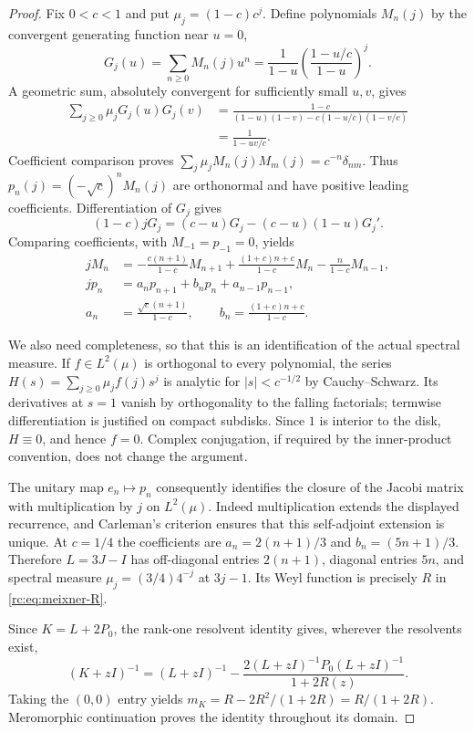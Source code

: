 \documentclass[11pt,a4paper]{article}
\theoremstyle{definition}
\theoremstyle{remark}
\theoremstyle{plain}
\numberwithin{equation}{section}
\begin{document}
\begin{proof}
Fix $0<c<1$ and put $\mu_j=(1-c)c^j$.  Define polynomials $M_n(j)$
by the convergent generating function near $u=0$,
\[
 G_j(u)=\sum_{n\ge0}M_n(j)u^n
       =\frac1{1-u}\left(\frac{1-u/c}{1-u}\right)^j.
\]
A geometric sum, absolutely convergent for sufficiently small $u,v$,
gives
\begin{align*}
 \sum_{j\ge0}\mu_jG_j(u)G_j(v)
 &=\frac{1-c}{(1-u)(1-v)-c(1-u/c)(1-v/c)}\\
 &=\frac1{1-uv/c}.
\end{align*}
Coefficient comparison proves
$\sum_j\mu_jM_n(j)M_m(j)=c^{-n}\delta_{nm}$.  Thus
$p_n(j)=(-\sqrt c)^nM_n(j)$ are orthonormal and have positive leading
coefficients.  Differentiation of $G_j$ gives
\[
 (1-c)jG_j=(c-u)G_j-(c-u)(1-u)G_j'.
\]
Comparing coefficients, with $M_{-1}=p_{-1}=0$, yields
\begin{align*}
 jM_n&=-\frac{c(n+1)}{1-c}M_{n+1}
       +\frac{(1+c)n+c}{1-c}M_n-\frac n{1-c}M_{n-1},\\
 jp_n&=a_np_{n+1}+b_np_n+a_{n-1}p_{n-1},\\
 a_n&=\frac{\sqrt c(n+1)}{1-c},\qquad
 b_n=\frac{(1+c)n+c}{1-c}.
\end{align*}

We also need completeness, so that this is an identification of the
actual spectral measure.  If $f\in L^2(\mu)$ is orthogonal to every
polynomial, the series
$H(s)=\sum_{j\ge0}\mu_j f(j)s^j$ is analytic for
$|s|<c^{-1/2}$ by Cauchy--Schwarz.  Its derivatives at $s=1$ vanish by
orthogonality to the falling factorials; termwise differentiation is
justified on compact subdisks.  Since $1$ is interior to the disk,
$H\equiv0$, and hence $f=0$.  Complex conjugation, if required by the
inner-product convention, does not change the argument.

The unitary map $e_n\mapsto p_n$ consequently identifies the closure of
the Jacobi matrix with multiplication by $j$ on $L^2(\mu)$.
Indeed multiplication extends the displayed recurrence, and Carleman's
criterion ensures that this self-adjoint extension is unique.  At
$c=1/4$ the coefficients are $a_n=2(n+1)/3$ and $b_n=(5n+1)/3$.
Therefore $L=3J-I$ has off-diagonal entries $2(n+1)$, diagonal entries
$5n$, and spectral measure $\mu_j=(3/4)4^{-j}$ at $3j-1$.  Its Weyl
function is precisely $R$ in \eqref{rc:eq:meixner-R}.

Since $K=L+2P_0$, the rank-one resolvent identity gives, wherever the
resolvents exist,
\[
 (K+zI)^{-1}=(L+zI)^{-1}
 -\frac{2(L+zI)^{-1}P_0(L+zI)^{-1}}{1+2R(z)}.
\]
Taking the $(0,0)$ entry yields $m_K=R-2R^2/(1+2R)=R/(1+2R)$.
Meromorphic continuation proves the identity throughout its domain.
\end{proof}
\end{document}
